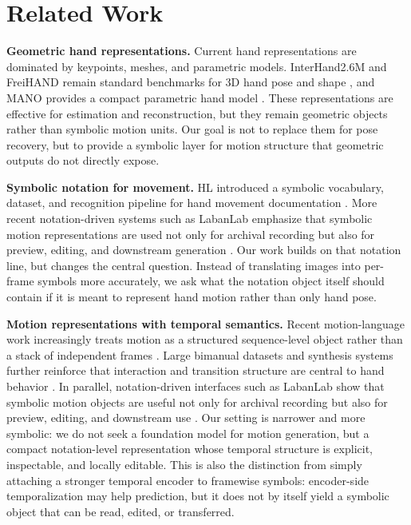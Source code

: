 \documentclass[letterpaper]{article}
\begin{document}
\section{Related Work}

\textbf{Geometric hand representations.}
Current hand representations are dominated by keypoints, meshes, and parametric
models. InterHand2.6M and FreiHAND remain standard benchmarks for 3D hand pose
and shape \citep{moon2020interhand, zimmermann2019freihand}, and MANO provides a
compact parametric hand model \citep{romero2017mano}. These representations are
effective for estimation and reconstruction, but they remain geometric objects
rather than symbolic motion units. Our goal is not to replace them for pose
recovery, but to provide a symbolic layer for motion structure that geometric
outputs do not directly expose.

\textbf{Symbolic notation for movement.}
HL introduced a symbolic vocabulary, dataset, and recognition pipeline for hand
movement documentation \citep{li2024hl}. More recent notation-driven systems
such as LabanLab emphasize that symbolic motion representations are used not
only for archival recording but also for preview, editing, and downstream
generation \citep{yan2025labanlab}. Our work builds on that notation line, but
changes the central question. Instead of translating images into per-frame
symbols more accurately, we ask what the notation object itself should contain
if it is meant to represent hand motion rather than only hand pose.

\textbf{Motion representations with temporal semantics.}
Recent motion-language work increasingly treats motion as a structured
sequence-level object rather than a stack of independent frames
\citep{chen2025language}. Large bimanual datasets and synthesis systems further
reinforce that interaction and transition structure are central to hand
behavior \citep{fu2025gigahands, zhang2025bimart}. In parallel, notation-driven
interfaces such as LabanLab show that symbolic motion objects are useful not
only for archival recording but also for preview, editing, and downstream use
\citep{yan2025labanlab}. Our setting is narrower and more symbolic: we do not
seek a foundation model for motion generation, but a compact notation-level
representation whose temporal structure is explicit, inspectable, and locally
editable. This is also the distinction from simply attaching a stronger
temporal encoder to framewise symbols: encoder-side temporalization may help
prediction, but it does not by itself yield a symbolic object that can be read,
edited, or transferred.
\end{document}
